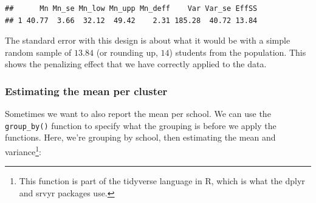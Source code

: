 \documentclass[
]{article}
\newenvironment{Shaded}{\begin{snugshade}}{\end{snugshade}}
\newcommand{\DataTypeTok}[1]{\textcolor[rgb]{0.13,0.29,0.53}{#1}}
\newcommand{\DecValTok}[1]{\textcolor[rgb]{0.00,0.00,0.81}{#1}}
\newcommand{\KeywordTok}[1]{\textcolor[rgb]{0.13,0.29,0.53}{\textbf{#1}}}
\newcommand{\NormalTok}[1]{#1}
\newcommand{\OperatorTok}[1]{\textcolor[rgb]{0.81,0.36,0.00}{\textbf{#1}}}
\newcommand{\StringTok}[1]{\textcolor[rgb]{0.31,0.60,0.02}{#1}}
\begin{document}
\begin{Shaded}
\end{Shaded}

\begin{verbatim}
##      Mn Mn_se Mn_low Mn_upp Mn_deff    Var Var_se EffSS
## 1 40.77  3.66  32.12  49.42    2.31 185.28  40.72 13.84
\end{verbatim}

The standard error with this design is about what it would be with a simple random sample of \(13.84\) (or rounding up, \(14\)) students from the population. This shows the penalizing effect that we have correctly applied to the data.

\hypertarget{estimating-the-mean-per-cluster}{%
\subsubsection{Estimating the mean per cluster}\label{estimating-the-mean-per-cluster}}

Sometimes we want to also report the mean per school. We can use the \texttt{group\_by()} function to specify what the grouping is before we apply the functions. Here, we're grouping by school, then estimating the mean and variance\footnote{This function is part of the tidyverse language in R, which is what the dplyr and srvyr packages use.}:

\begin{Shaded}
\end{Shaded}
\end{document}
